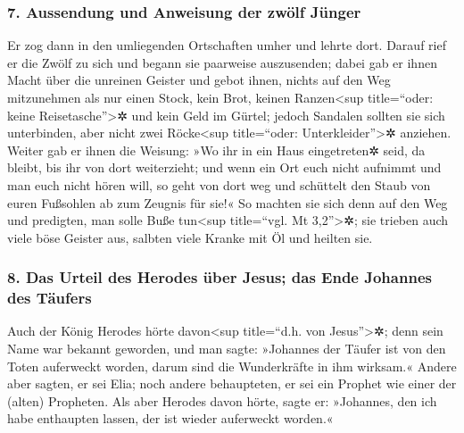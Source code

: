 \hypertarget{aussendung-und-anweisung-der-zwuxf6lf-juxfcnger}{%
\subsubsection{7. Aussendung und Anweisung der zwölf
Jünger}\label{aussendung-und-anweisung-der-zwuxf6lf-juxfcnger}}

Er zog dann in den umliegenden Ortschaften umher und lehrte dort.
 Darauf rief er die Zwölf zu sich und begann sie paarweise
auszusenden; dabei gab er ihnen Macht über die unreinen Geister
 und gebot ihnen, nichts auf den Weg mitzunehmen als nur
einen Stock, kein Brot, keinen Ranzen\textless sup title=``oder: keine
Reisetasche''\textgreater✲ und kein Geld im Gürtel; 
jedoch Sandalen sollten sie sich unterbinden, aber nicht zwei
Röcke\textless sup title=``oder: Unterkleider''\textgreater✲ anziehen.
 Weiter gab er ihnen die Weisung: »Wo ihr in ein Haus
eingetreten✲ seid, da bleibt, bis ihr von dort weiterzieht;
 und wenn ein Ort euch nicht aufnimmt und man euch nicht
hören will, so geht von dort weg und schüttelt den Staub von euren
Fußsohlen ab zum Zeugnis für sie!«  So machten sie sich
denn auf den Weg und predigten, man solle Buße tun\textless sup
title=``vgl. Mt 3,2''\textgreater✲;  sie trieben auch
viele böse Geister aus, salbten viele Kranke mit Öl und heilten sie.

\hypertarget{das-urteil-des-herodes-uxfcber-jesus-das-ende-johannes-des-tuxe4ufers}{%
\subsubsection{8. Das Urteil des Herodes über Jesus; das Ende Johannes
des
Täufers}\label{das-urteil-des-herodes-uxfcber-jesus-das-ende-johannes-des-tuxe4ufers}}

 Auch der König Herodes hörte davon\textless sup
title=``d.h. von Jesus''\textgreater✲; denn sein Name war bekannt
geworden, und man sagte: »Johannes der Täufer ist von den Toten
auferweckt worden, darum sind die Wunderkräfte in ihm wirksam.«
 Andere aber sagten, er sei Elia; noch andere
behaupteten, er sei ein Prophet wie einer der (alten) Propheten.
 Als aber Herodes davon hörte, sagte er: »Johannes, den
ich habe enthaupten lassen, der ist wieder auferweckt worden.«

